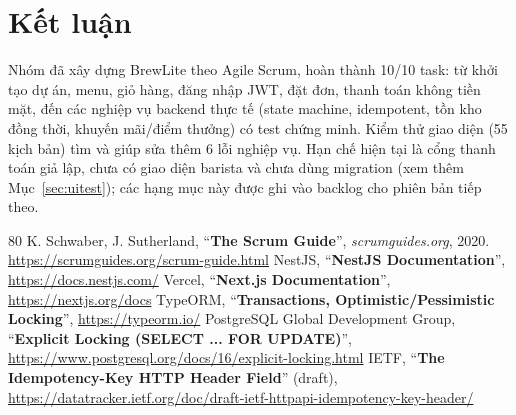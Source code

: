 \documentclass[a4paper]{article}
\begin{document}
\section{Kết luận}
Nhóm đã xây dựng BrewLite theo Agile Scrum, hoàn thành 10/10 task: từ khởi tạo dự án, menu, giỏ hàng, đăng nhập JWT, đặt đơn, thanh toán không tiền mặt, đến các nghiệp vụ backend thực tế (state machine, idempotent, tồn kho đồng thời, khuyến mãi/điểm thưởng) có test chứng minh. Kiểm thử giao diện (55 kịch bản) tìm và giúp sửa thêm 6 lỗi nghiệp vụ. Hạn chế hiện tại là cổng thanh toán giả lập, chưa có giao diện barista và chưa dùng migration (xem thêm Mục~\ref{sec:uitest}); các hạng mục này được ghi vào backlog cho phiên bản tiếp theo.

\begin{thebibliography}{80}
 K. Schwaber, J. Sutherland, ``\textbf{The Scrum Guide}'', \textit{scrumguides.org}, 2020. \url{https://scrumguides.org/scrum-guide.html}
 NestJS, ``\textbf{NestJS Documentation}'', \url{https://docs.nestjs.com/}
 Vercel, ``\textbf{Next.js Documentation}'', \url{https://nextjs.org/docs}
 TypeORM, ``\textbf{Transactions, Optimistic/Pessimistic Locking}'', \url{https://typeorm.io/}
 PostgreSQL Global Development Group, ``\textbf{Explicit Locking (SELECT ... FOR UPDATE)}'', \url{https://www.postgresql.org/docs/16/explicit-locking.html}
 IETF, ``\textbf{The Idempotency-Key HTTP Header Field}'' (draft), \url{https://datatracker.ietf.org/doc/draft-ietf-httpapi-idempotency-key-header/}
\end{thebibliography}
\end{document}
